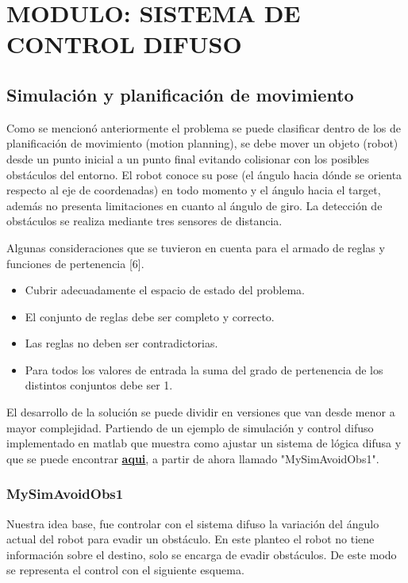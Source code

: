 \section{MODULO: SISTEMA DE CONTROL DIFUSO}

\subsection{Simulación y planificación de movimiento}

Como se mencionó anteriormente el problema se puede clasificar dentro de los de planificación de movimiento (motion planning), se debe mover un objeto (robot) desde un punto inicial a un punto final evitando colisionar con los posibles obstáculos del entorno. El robot conoce su pose (el ángulo hacia dónde se orienta respecto al eje de coordenadas) en todo momento y el ángulo hacia el target, además no presenta limitaciones en cuanto al ángulo de giro. La detección de obstáculos se realiza mediante tres sensores de distancia.

Algunas consideraciones que se tuvieron en cuenta para el armado de reglas y funciones de pertenencia [6].

\begin{itemize}
    \item Cubrir adecuadamente el espacio de estado del problema.
    \item El conjunto de reglas debe ser completo y correcto.
    \item Las reglas no deben ser contradictorias.
    \item Para todos los valores de entrada la suma del grado de pertenencia de los distintos conjuntos debe ser 1.
\end{itemize}

El desarrollo de la solución se puede dividir en versiones que van desde menor a mayor complejidad. Partiendo de un ejemplo de simulación y control difuso implementado en matlab que muestra como ajustar un sistema de lógica difusa y que se puede encontrar \href{https://www.mathworks.com/help/fuzzy/tune-fuzzy-systems-using-custom-cost-function.html}{\textbf{aqui}}, a partir de ahora llamado "MySimAvoidObs1".

\subsubsection{MySimAvoidObs1}

Nuestra idea base, fue controlar con el sistema difuso la variación del ángulo actual del robot para evadir un obstáculo. En este planteo el robot no tiene información sobre el destino, solo se encarga de evadir obstáculos. De este modo se representa el control con el siguiente esquema.

